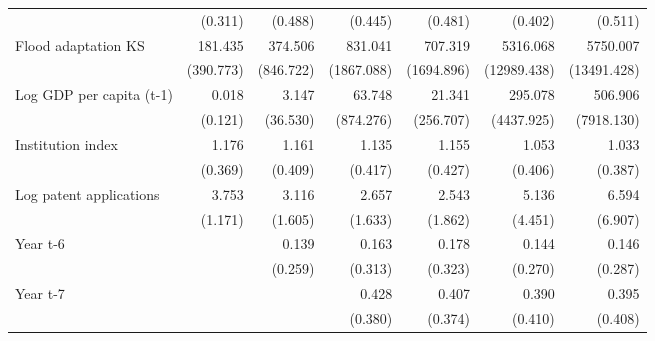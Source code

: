 \begin{table}[htbp]
\begin{tabular}{l*{6}{D{.}{.}{-1}}}
                    &     (0.311)         &     (0.488)         &     (0.445)         &     (0.481)         &     (0.402)         &     (0.511)         \\
\addlinespace
Flood adaptation KS &     181.435\sym{**} &     374.506\sym{***}&     831.041\sym{***}&     707.319\sym{***}&    5316.068\sym{***}&    5750.007\sym{***}\\
                    &   (390.773)         &   (846.722)         &  (1867.088)         &  (1694.896)         & (12989.438)         & (13491.428)         \\
\addlinespace
Log GDP per capita (t-1)&       0.018         &       3.147         &      63.748         &      21.341         &     295.078         &     506.906         \\
                    &     (0.121)         &    (36.530)         &   (874.276)         &   (256.707)         &  (4437.925)         &  (7918.130)         \\
\addlinespace
Institution index   &       1.176         &       1.161         &       1.135         &       1.155         &       1.053         &       1.033         \\
                    &     (0.369)         &     (0.409)         &     (0.417)         &     (0.427)         &     (0.406)         &     (0.387)         \\
\addlinespace
Log patent applications&       3.753\sym{***}&       3.116\sym{**} &       2.657\sym{\%}  &       2.543         &       5.136\sym{*}  &       6.594\sym{*}  \\
                    &     (1.171)         &     (1.605)         &     (1.633)         &     (1.862)         &     (4.451)         &     (6.907)         \\
\addlinespace
Year t-6            &                     &       0.139         &       0.163         &       0.178         &       0.144         &       0.146         \\
                    &                     &     (0.259)         &     (0.313)         &     (0.323)         &     (0.270)         &     (0.287)         \\
\addlinespace
Year t-7            &                     &                     &       0.428         &       0.407         &       0.390         &       0.395         \\
                    &                     &                     &     (0.380)         &     (0.374)         &     (0.410)         &     (0.408)         \\

\end{tabular}
\end{table}
